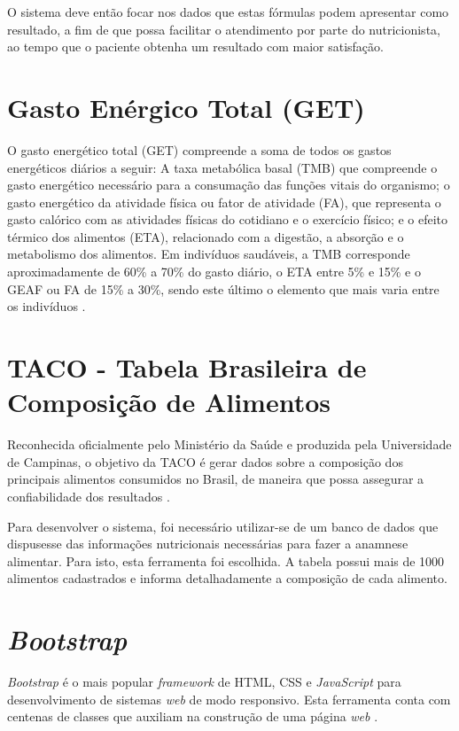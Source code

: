 \documentclass[
	12pt,				%
    oneside,			%
	a4paper,			%
	english,			%
	french,				%
	spanish,			%
	brazil,				%
	]{abntex2}
\begin{document}
O sistema deve então focar nos dados que estas fórmulas podem apresentar
como resultado, a fim de que possa facilitar o atendimento por parte do nutricionista,
ao tempo que o paciente obtenha um resultado com maior satisfação.


\section{Gasto Enérgico Total (GET)}

O gasto energético total (GET) compreende a soma de todos os gastos energéticos diários a seguir: A
taxa metabólica basal (TMB) que compreende o gasto energético necessário para a
consumação das funções vitais do organismo; o gasto energético da atividade física
ou fator de atividade (FA), que representa o gasto calórico com as atividades físicas
do cotidiano e o exercício físico; e o efeito térmico dos alimentos (ETA), relacionado
com a digestão, a absorção e o metabolismo dos alimentos. Em indivíduos saudáveis,
a TMB corresponde aproximadamente de 60\% a 70\% do gasto diário, o ETA entre 5\% 
e 15\% e o GEAF ou FA de 15\% a 30\%, sendo este último o elemento que mais varia
entre os indivíduos \cite{hill}. 

\section{TACO - Tabela Brasileira de Composição de Alimentos}

Reconhecida oficialmente pelo Ministério da Saúde e produzida pela Universidade de Campinas, o objetivo da TACO é gerar dados sobre a composição dos principais alimentos consumidos no Brasil, de maneira que possa assegurar a confiabilidade dos resultados \cite{taco}. 

Para desenvolver o sistema, foi necessário utilizar-se de um banco de dados que dispusesse das informações nutricionais necessárias para fazer a anamnese alimentar. Para isto, esta ferramenta foi escolhida. A tabela possui mais de 1000 alimentos cadastrados e informa detalhadamente a composição de cada alimento.

\section{\textit{Bootstrap}}

\textit{Bootstrap} é o mais popular \textit{framework} de HTML, CSS e \textit{JavaScript} para desenvolvimento de sistemas \textit{web} de modo responsivo. Esta ferramenta conta com centenas de classes que auxiliam na construção de uma página \textit{web} \cite{bootstrap}.
\end{document}
